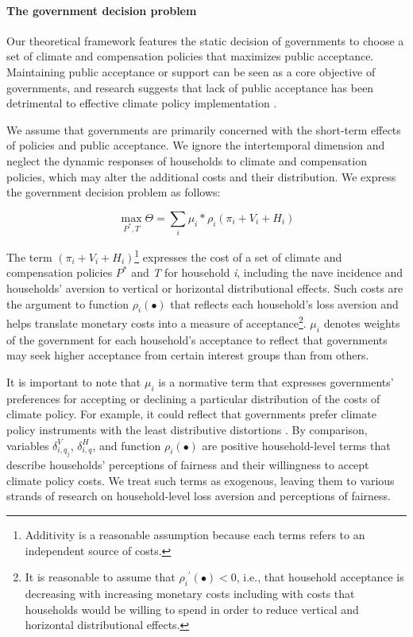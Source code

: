 \documentclass[12pt, a4paper]{article}
\begin{document}
\paragraph{The government decision problem}
Our theoretical framework features the static decision of governments to choose a set of climate and compensation policies that maximizes public acceptance. Maintaining public acceptance or support can be seen as a core objective of governments, and research suggests that lack of public acceptance has been detrimental to effective climate policy implementation \autocite{Carattini.2018,Bergquist.2022,Douenne.2022}.

We assume that governments are primarily concerned with the short-term effects of policies and public acceptance. We ignore the intertemporal dimension and neglect the dynamic responses of households to climate and compensation policies, which may alter the additional costs and their distribution. We express the government decision problem as follows:  

\begin{equation} \label{eq:theta}
    \max_{P^{\ast},T} \Theta = \sum_{i} \mu_{i} * \rho_{i}(\pi_{i} + V_{i} + H_{i})
\end{equation}

The term $(\pi_{i} + V_{i} + H_{i})$\footnote{Additivity is a reasonable assumption because each terms refers to an independent source of costs.} expresses the cost of a set of climate and compensation policies $P^{\ast}$ and \textit{T} for household \textit{i}, including the nave incidence and households' aversion to vertical or horizontal distributional effects. Such costs are the argument to function $\rho_{i}(\bullet)$ that reflects each household's loss aversion \autocite{Tversky.1991} and helps translate monetary costs into a measure of acceptance\footnote{It is reasonable to assume that ${\rho_{i}}^{\prime}(\bullet)<0$, i.e., that household acceptance is decreasing with increasing monetary costs including with costs that households would be willing to spend in order to reduce vertical and horizontal distributional effects.}. $\mu_{i}$ denotes weights of the government for each household's acceptance to reflect that governments may seek higher acceptance from certain interest groups than from others.

It is important to note that $\mu_{i}$ is a normative term that expresses governments' preferences for accepting or declining a particular distribution of the costs of climate policy. For example, it could reflect that governments prefer climate policy instruments with the least distributive distortions \autocite{Fischer.2019}. By comparison, variables $\delta_{i,q_{j}}^{V}$, $\delta_{i,q}^{H}$, and function $\rho_{i}(\bullet)$ are positive household-level terms that describe households' perceptions of fairness and their willingness to accept climate policy costs. We treat such terms as exogenous, leaving them to various strands of research on household-level loss aversion and perceptions of fairness. 
\end{document}
